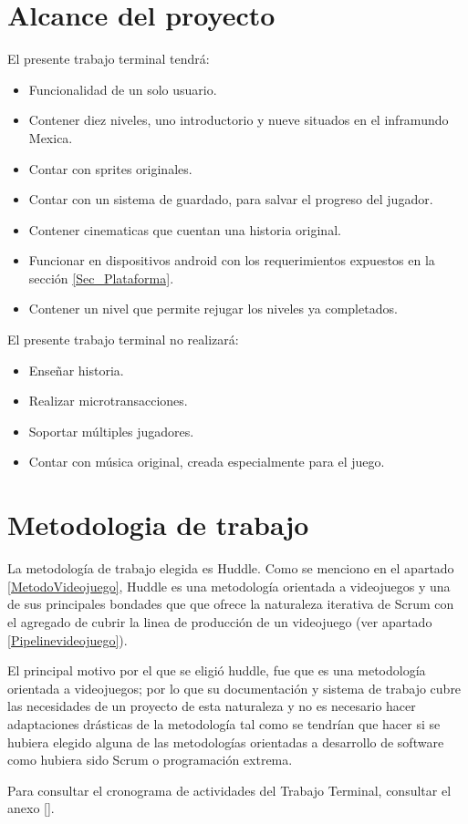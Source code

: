 \section{Alcance del proyecto} \label{Sec_Alcance}
	El presente trabajo terminal tendrá:
		\begin{itemize}
			\item Funcionalidad de un solo usuario.
			\item Contener diez niveles, uno introductorio y nueve situados en el inframundo Mexica.
			\item Contar con sprites originales.
			\item Contar con un sistema de guardado, para salvar el progreso del jugador.
			\item Contener cinematicas que cuentan una historia original.
			\item Funcionar en dispositivos android con los requerimientos expuestos en la sección \ref{Sec_Plataforma}.
			\item Contener un nivel que permite rejugar los niveles ya completados. 
		\end{itemize}
	El presente trabajo terminal no realizará:
	\begin{itemize}
		\item Enseñar historia.
		\item Realizar microtransacciones.
		\item Soportar múltiples jugadores.
		\item Contar con música original, creada especialmente para el juego.
	\end{itemize}
\section{Metodologia de trabajo}\label{Sec_Metodologia}
La metodología de trabajo elegida es Huddle. Como se menciono en el apartado
 \ref{MetodoVideojuego}, Huddle es una metodología orientada a videojuegos y una
  de sus principales bondades que que ofrece la naturaleza iterativa de Scrum 
  con el agregado de cubrir la linea de producción de un videojuego 
  (ver apartado \ref{Pipelinevideojuego}).
\\
\par
El principal motivo por el que se eligió huddle, fue que es una metodología 
orientada a videojuegos; por lo que su documentación y sistema de trabajo cubre 
las necesidades de un proyecto de esta naturaleza y no es necesario hacer 
adaptaciones drásticas de la metodología tal como se tendrían que hacer si se 
hubiera elegido alguna de las metodologías orientadas a desarrollo de software 
como hubiera sido Scrum o programación extrema. 
\\
\par
Para consultar el cronograma de actividades del Trabajo Terminal, consultar el anexo \ref{}.

